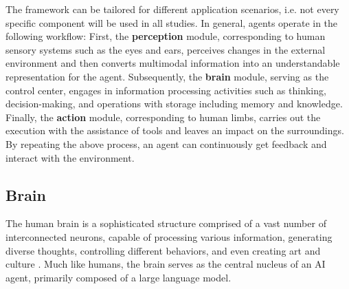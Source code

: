 The framework can be tailored for different application scenarios, i.e. not every specific component will be used in all studies. 
In general, agents operate in the following workflow: First, the \textbf{perception} module, corresponding to human sensory systems such as the eyes and ears, perceives changes in the external environment and then converts multimodal information into an understandable representation for the agent. 
Subsequently, the \textbf{brain} module, serving as the control center, engages in information processing activities such as thinking, decision-making, and operations with storage including memory and knowledge. 
Finally, the \textbf{action} module, corresponding to human limbs, carries out the execution with the assistance of tools and leaves an impact on the surroundings. By repeating the above process, an agent can continuously get feedback and interact with the environment.


\subsection{Brain}\label{sec:Brain}

The human brain is a sophisticated structure comprised of a vast number of interconnected neurons, capable of processing various information, generating diverse thoughts, controlling different behaviors, and even creating art and culture \cite{marshall2013discoveries}. 
Much like humans, the brain serves as the central nucleus of an AI agent, primarily composed of a large language model. 

